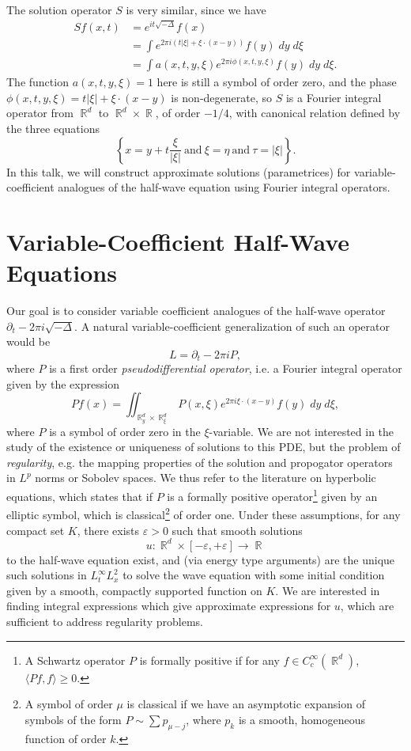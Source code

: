\documentclass{article}
\theoremstyle{plain}
\theoremstyle{remark}
\theoremstyle{definition}
\DeclareMathOperator{\RR}{\mathbb{R}}
\begin{document}
The solution operator $S$ is very similar, since we have
%
\begin{align*}
	Sf(x,t) &= e^{it \sqrt{-\Delta}} f(x)\\
	&= \int e^{2 \pi i (t |\xi| + \xi \cdot (x - y))} f(y)\; dy\; d\xi\\
	&= \int a(x,t,y,\xi) e^{2 \pi i \phi(x,t,y,\xi)} f(y)\; dy\; d\xi.
\end{align*}
%
The function $a(x,t,y,\xi) = 1$ here is still a symbol of order zero, and the phase $\phi(x,t,y,\xi) = t |\xi| + \xi \cdot (x - y)$ is non-degenerate, so $S$ is a Fourier integral operator from $\RR^d$ to $\RR^d \times \RR$, of order $-1/4$, with canonical relation defined by the three equations
%
\[ \left\{ x = y + t \frac{\xi}{|\xi|}\ \text{and}\ \xi = \eta\ \text{and}\ \tau = |\xi| \right\}. \]
%
In this talk, we will construct approximate solutions (parametrices) for variable-coefficient analogues of the half-wave equation using Fourier integral operators.

\section{Variable-Coefficient Half-Wave Equations}

Our goal is to consider variable coefficient analogues of the half-wave operator $\partial_t - 2\pi i \sqrt{-\Delta}$. A natural variable-coefficient generalization of such an operator would be
%
\[ L = \partial_t - 2 \pi i P, \]
%
where $P$ is a first order \emph{pseudodifferential operator}, i.e. a Fourier integral operator given by the expression
%
\[ Pf(x) = \iint_{\RR^d_y \times \RR^d_\xi} P(x,\xi) e^{2 \pi i \xi \cdot (x - y)} f(y)\; dy\; d\xi, \]
%
where $P$ is a symbol of order zero in the $\xi$-variable. We are not interested in the study of the existence or uniqueness of solutions to this PDE, but the problem of \emph{regularity}, e.g. the mapping properties of the solution and propogator operators in $L^p$ norms or Sobolev spaces. We thus refer to the literature on hyperbolic equations, which states that if $P$ is a formally positive operator\footnote{A Schwartz operator $P$ is formally positive if for any $f \in C_c^\infty(\RR^d)$, $\langle Pf, f \rangle \geq 0$.}  given by an elliptic symbol, which is classical\footnote{A symbol of order $\mu$ is classical if we have an asymptotic expansion of symbols of the form $P \sim \sum p_{\mu-j}$, where $p_k$ is a smooth, homogeneous function of order $k$.} of order one. Under these assumptions, for any compact set $K$, there exists $\varepsilon > 0$ such that smooth solutions
%
\[ u: \RR^d \times [-\varepsilon,+\varepsilon] \to \RR \]
%
to the half-wave equation exist, and (via energy type arguments) are the unique such solutions in $L^\infty_t L^2_x$ to solve the wave equation with some initial condition given by a smooth, compactly supported function on $K$. We are interested in finding integral expressions which give approximate expressions for $u$, which are sufficient to address regularity problems.
\end{document}
